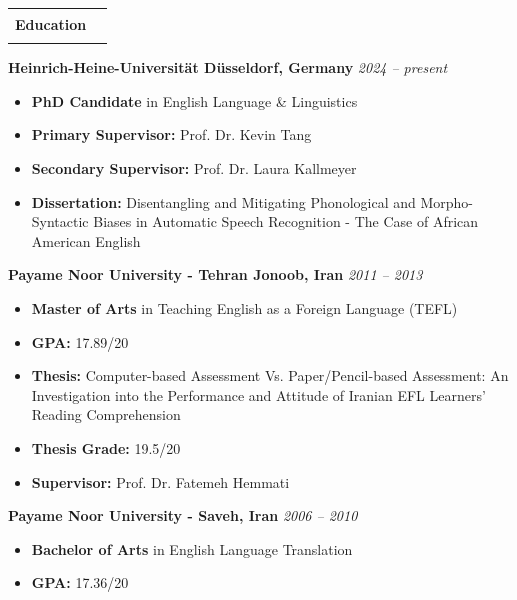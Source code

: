 \documentclass[11pt,a4paper]{article}
\makeatletter
\newcommand{\inlinesection}[1]{%
  \vspace{1em}
  \noindent
  \begin{tabular*}{\linewidth}{@{}l@{\extracolsep{\fill}}r@{}}
    \Large\textbf{\color{darkblue} #1} & \color{darkblue}\rule{0.7\linewidth}{1.2pt} \\
  \end{tabular*}
  \par\vspace{0.7em}
}
\makeatother
\begin{document}
\inlinesection{Education}
\begin{list}{}{
  \setlength{\leftmargin}{0pt}
  \setlength{\labelwidth}{0pt}
  \setlength{\itemindent}{0pt}
  \setlength{\parsep}{0pt}
  \setlength{\itemsep}{1em} %
}
\item \textcolor{RedViolet}{\textbf{Heinrich-Heine-Universität Düsseldorf, Germany} \hfill \textit{2024 – present}} \vspace{0.5em}
      \begin{itemize}
          \item \textbf{PhD Candidate} in English Language \& Linguistics 
          \item \textbf{Primary Supervisor:} Prof. Dr. Kevin Tang
          \item \textbf{Secondary Supervisor:} Prof. Dr. Laura Kallmeyer
          \item \textbf{Dissertation:} Disentangling and Mitigating Phonological and Morpho-Syntactic Biases in Automatic Speech Recognition - The Case of African American English
      \end{itemize}
            

\item \textcolor{RedViolet}{\textbf{Payame Noor University - Tehran Jonoob, Iran}  \hfill \textit{2011 – 2013}} \vspace{0.5em}

      \begin{itemize}
          \item \textbf{Master of Arts} in Teaching English as a Foreign Language (TEFL)
          \item \textbf{GPA:} 17.89/20
          \item \textbf{Thesis:} Computer-based Assessment Vs. Paper/Pencil-based Assessment: An Investigation into the Performance and Attitude of Iranian EFL Learners' Reading Comprehension
          \item \textbf{Thesis Grade:} 19.5/20 
          \item \textbf{Supervisor:} Prof. Dr. Fatemeh Hemmati
      \end{itemize}

\item \textcolor{RedViolet}{\textbf{Payame Noor University - Saveh, Iran}  \hfill \textit{2006 – 2010}} \vspace{0.5em}
      \begin{itemize}
          \item \textbf{Bachelor of Arts} in English Language Translation
          \item \textbf{GPA:} 17.36/20 
      \end{itemize}


\end{list}
\end{document}
